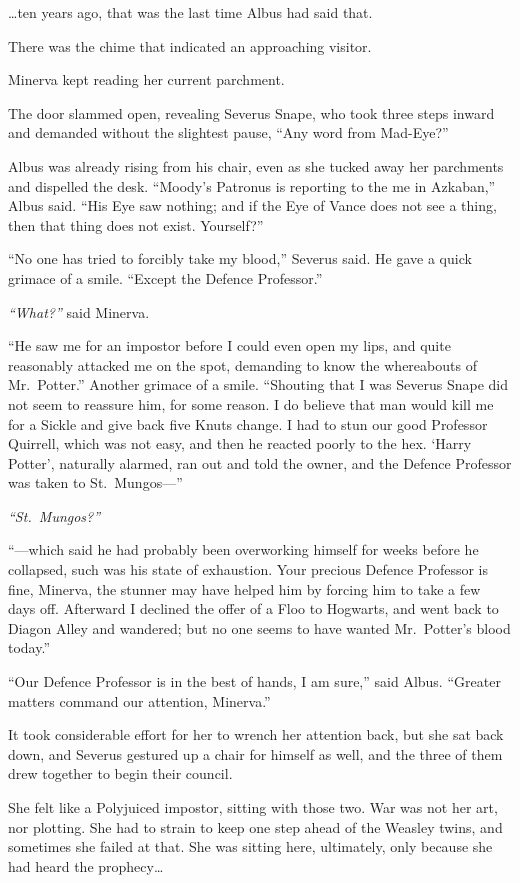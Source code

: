 \ldots{}ten years ago, that was the last time Albus had said that.

There was the chime that indicated an approaching visitor.

Minerva kept reading her current parchment.

The door slammed open, revealing Severus Snape, who took three steps
inward and demanded without the slightest pause, ``Any word from
Mad-Eye?''

Albus was already rising from his chair, even as she tucked away her
parchments and dispelled the desk. ``Moody's Patronus is reporting to
the me in Azkaban,'' Albus said. ``His Eye saw nothing; and if the Eye
of Vance does not see a thing, then that thing does not exist.
Yourself?''

``No one has tried to forcibly take my blood,'' Severus said. He gave a
quick grimace of a smile. ``Except the Defence Professor.''

\emph{``What?''} said Minerva.

``He saw me for an impostor before I could even open my lips, and quite
reasonably attacked me on the spot, demanding to know the whereabouts of
Mr.~Potter.'' Another grimace of a smile. ``Shouting that I was Severus
Snape did not seem to reassure him, for some reason. I do believe that
man would kill me for a Sickle and give back five Knuts change. I had to
stun our good Professor Quirrell, which was not easy, and then he
reacted poorly to the hex. `Harry Potter', naturally alarmed, ran out
and told the owner, and the Defence Professor was taken to
St.~Mungos---''

\emph{``St.~Mungos?''}

``---which said he had probably been overworking himself for weeks
before he collapsed, such was his state of exhaustion. Your precious
Defence Professor is fine, Minerva, the stunner may have helped him by
forcing him to take a few days off. Afterward I declined the offer of a
Floo to Hogwarts, and went back to Diagon Alley and wandered; but no one
seems to have wanted Mr.~Potter's blood today.''

``Our Defence Professor is in the best of hands, I am sure,'' said
Albus. ``Greater matters command our attention, Minerva.''

It took considerable effort for her to wrench her attention back, but
she sat back down, and Severus gestured up a chair for himself as well,
and the three of them drew together to begin their council.

She felt like a Polyjuiced impostor, sitting with those two. War was not
her art, nor plotting. She had to strain to keep one step ahead of the
Weasley twins, and sometimes she failed at that. She was sitting here,
ultimately, only because she had heard the prophecy\ldots{}

